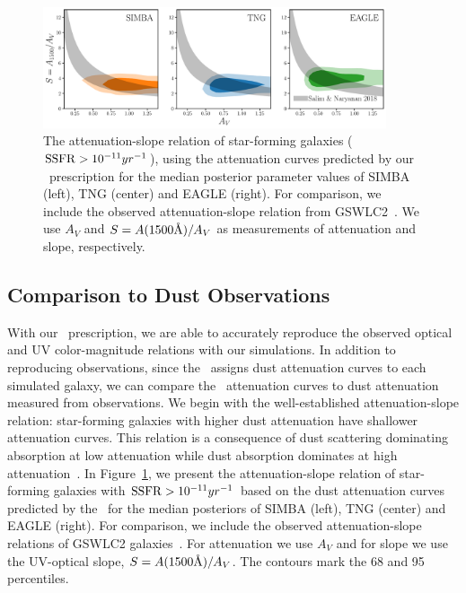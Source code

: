 \begin{figure}
\begin{center}
    \includegraphics[width=0.9\textwidth]{figs/abc_slope_AV_starforming.pdf}
    \caption{\label{fig:slope}
    The attenuation-slope relation of star-forming galaxies (${\rm SSFR} >
    10^{-11}yr^{-1}$), using the attenuation curves predicted by our  
    \eda~prescription for the median posterior parameter values of SIMBA
    (left), TNG (center) and EAGLE (right). 
    For comparison, we include the observed attenuation-slope relation
    from GSWLC2~\citep{salim2020}. 
    We use $A_V$ and $S = A(1500\AA)/A_V$ as measurements of attenuation and
    slope, respectively. 
    }
\end{center}
\end{figure}

\subsection{Comparison to Dust Observations} \label{sec:reproduce}
With our \eda~prescription, we are able to accurately reproduce the
observed optical and UV color-magnitude relations with our simulations. 
In addition to  reproducing observations, since the \eda~assigns dust
attenuation curves to each simulated galaxy, we can compare the
\eda~attenuation curves to dust attenuation measured from
observations. 
We begin with the well-established attenuation-slope relation: star-forming
galaxies with higher dust attenuation have shallower attenuation curves. 
This relation is a consequence of dust scattering dominating absorption at
low attenuation while dust absorption dominates at high
attenuation~\citep{gordon1994, witt2000, draine2003, chevallard2013}. 
In Figure~\ref{fig:slope}, we present the attenuation-slope relation of
star-forming galaxies with ${\rm SSFR} > 10^{-11}yr^{-1}$ based on the
dust attenuation curves predicted by the \eda~for the median posteriors of
SIMBA (left), TNG (center) and EAGLE (right).
For comparison, we include the observed attenuation-slope relations of
GSWLC2 galaxies~\citep[grey shaded;][]{salim2020}.
For attenuation we use $A_V$ and for slope we use the UV-optical slope, $S
= A(1500\AA)/A_V$.  The contours mark the 68 and 95 percentiles. 

